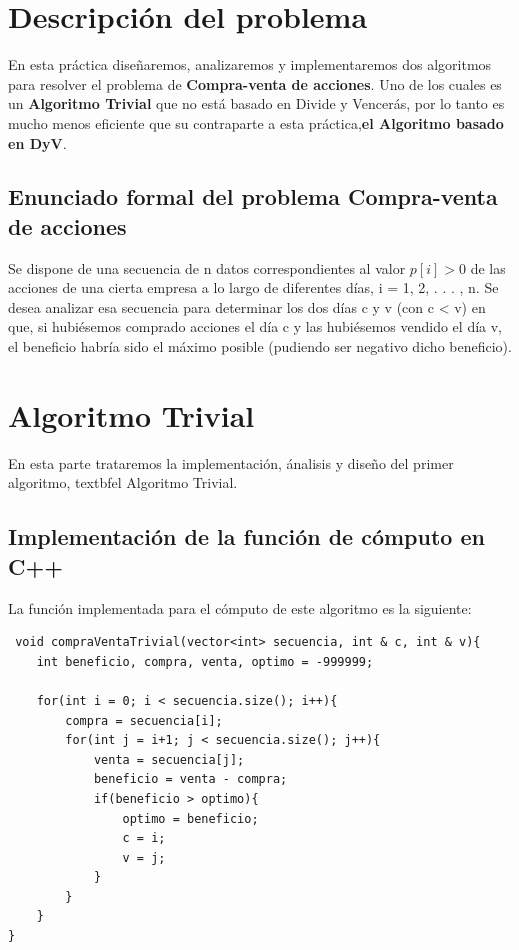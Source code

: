 \documentclass[12pt, spanish]{article}
\begin{document}
\newpage



\tableofcontents
\pagebreak


\renewcommand{\arraystretch}{1.25}

\section{Descripción del problema}

En esta práctica diseñaremos, analizaremos y implementaremos dos algoritmos para resolver el problema de \textbf{Compra-venta de acciones}.
Uno de los cuales es un \textbf{Algoritmo Trivial} que no está basado en Divide y Vencerás, por lo tanto es mucho menos eficiente que su contraparte a esta práctica,\textbf{el Algoritmo basado en DyV}.

\subsection{Enunciado formal del problema Compra-venta de acciones}
Se dispone de una secuencia de n datos correspondientes al valor $p[i] > 0$ de las acciones de una cierta empresa a lo largo de diferentes días, i = 1, 2, . . . , n. Se desea analizar esa secuencia para determinar los dos días c y v (con c < v) en que, si hubiésemos comprado acciones el día c y las hubiésemos vendido el día v, el beneficio habría sido el máximo posible (pudiendo ser negativo dicho beneficio).

\section{Algoritmo Trivial}
En esta parte trataremos la implementación, ánalisis y diseño del primer algoritmo, textbf{el Algoritmo Trivial}.

\subsection{Implementación de la función de cómputo en C++ }
La función implementada para el cómputo de este algoritmo es la siguiente:
\begin{verbatim}
 void compraVentaTrivial(vector<int> secuencia, int & c, int & v){
    int beneficio, compra, venta, optimo = -999999;
    
    for(int i = 0; i < secuencia.size(); i++){
        compra = secuencia[i];
        for(int j = i+1; j < secuencia.size(); j++){
            venta = secuencia[j];
            beneficio = venta - compra;
            if(beneficio > optimo){
                optimo = beneficio;
                c = i;
                v = j;
            }
        }
    }
}
\end{verbatim}
\end{document}
